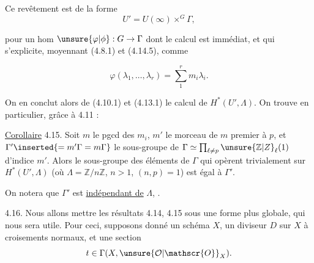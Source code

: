 
Ce revêtement est de la forme
\[
U'=U(\infty)\mathbin{\times^G}\Gamma,
\tag*{(}
\]

pour un hom $\unsure{\varphi|\phi}:G\to\Gamma$ dont le calcul est immédiat, et qui  s'explicite, moyennant (4.8.1) et (4.14.5), comme

\[
\varphi(\lambda_1,\ldots,\lambda_r)=\sum_1^r m_i\lambda_i.
\tag*{(4.14.6)}
\]

On en conclut alors de (4.10.1) et (4.13.1) le calcul de $H^*(U',\Lambda)$. On trouve en particulier, grâce à 4.11 :

\uline{Corollaire} 4.15.  Soit $m$ le pgcd des $m_i$,   $m'$ le morceau de $m$ premier à $p$, et $\Gamma'\inserted{=m'\Gamma=m\Gamma}$ le sous-groupe de $\Gamma\simeq\prod_{\ell\ne p}\unsure{\mathbb{Z}|Z}_\ell(1)$ d'indice $m'$. Alors le sous-groupe des éléments de $\Gamma$ qui opèrent trivialement sur $H^*(U',\Lambda)$ (où $\Lambda=\mathbb{Z}/n\mathbb{Z}$, $n>1$, $(n,p)=1$) est égal à $\Gamma'$. 

On notera que $\Gamma'$ est \uline{indépendant de} $\Lambda$, .


4.16. Nous allons mettre les résultats 4.14, 4.15 sous une forme  plus globale, qui nous sera utile. Pour ceci, supposons donné un schéma  $X$,  un diviseur $D$ sur $X$ à croisements normaux, et une section
\[
t\in\Gamma(X,\unsure{\mathcal{O}|\mathscr{O}}_X).
\]

 
